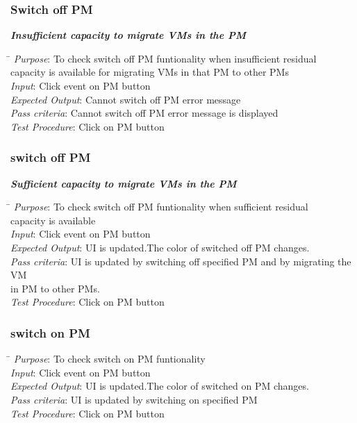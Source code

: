 \documentclass[a4paper,10pt]{article}
\begin{document}
\subsubsection{Switch off PM}
\emph{\bf Insufficient capacity to migrate VMs in the PM}
\begin{tabbing}
 \hspace*{4cm}\= \kill
 \emph{Purpose}\>: To check switch off PM funtionality when insufficient residual \\ \>capacity is available for migrating VMs in that PM to other PMs\\
 \emph{Input}\>: Click event on PM button\\
 \emph{Expected Output}\>: Cannot switch off PM error message\\
 \emph{Pass criteria}\>: Cannot switch off PM error message is displayed\\
 \emph{Test Procedure}\>: Click on PM button \\
\end{tabbing}
\subsubsection{switch off PM}
\emph{\bf Sufficient capacity to migrate VMs in the PM}
\begin{tabbing}
 \hspace*{4cm}\= \kill
 \emph{Purpose}\>: To check switch off PM funtionality when sufficient residual \\ \>capacity is available\\
 \emph{Input}\>: Click event on PM button\\
 \emph{Expected Output}\>: UI is updated.The color of switched off PM changes.\\
 \emph{Pass criteria}\>: UI is updated by switching off specified PM and by migrating the VM \\ \>in PM  to other PMs.\\
 \emph{Test Procedure}\>: Click on PM button\\
\end{tabbing}
\subsubsection{switch on PM}
\begin{tabbing}
 \hspace*{4cm}\= \kill
 \emph{Purpose}\>: To check switch on PM funtionality \\
\emph{Input}\>: Click event on PM button\\
 \emph{Expected Output}\>: UI is updated.The color of switched on PM changes.\\
 \emph{Pass criteria}\>: UI is updated by switching on specified PM\\
 \emph{Test Procedure}\>: Click on PM button\\
\end{tabbing}
\end{document}

